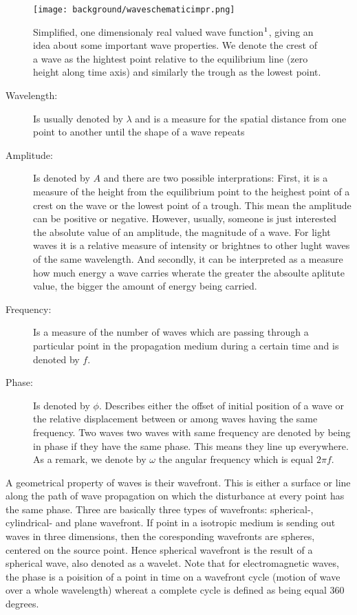 \begin{figure}[H]
  \centering
  \texttt{[image: background/waveschematicimpr.png]}
  \caption[sinewave]{Simplified, one dimensionaly real valued wave function$\footnotemark$, giving an idea about some important wave properties. We denote the crest of a wave as the hightest point relative to the equilibrium line (zero height along time axis) and similarly the trough as the lowest point.}
  \label{fig:wavebasics}
\end{figure}

\begin{description}
  \item[Wavelength:] Is usually denoted by $\lambda$ and is a measure for the spatial distance from one point to another until the shape of a wave repeats
  \item[Amplitude:] Is denoted by $A$ and there are two possible interprations: First, it is a measure of the height from the equilibrium point to the heighest point of a crest on the wave or the lowest point of a trough. This mean the amplitude can be positive or negative. However, usually, someone is  just interested the absolute value of an amplitude, the magnitude of a wave. For light waves it is a relative measure of intensity or brightnes to other lught waves of the same wavelength. And secondly, it can be interpreted as a measure how much energy a wave carries wherate the greater the absoulte aplitute value, the bigger the amount of energy being carried.
  \item[Frequency:] Is a measure of the number of waves which are passing through a particular point in the propagation medium during a certain time and is denoted by $f$.
  \item[Phase:] Is denoted by $\phi$. Describes either the offset of initial position of a wave or the relative displacement between or among waves having the same frequency. Two waves two waves with same frequency are denoted by being in phase if they have the same phase. This means they line up everywhere. As a remark, we denote by $\omega$ the angular frequency which is equal $2\pi f$. 
\end{description}

A geometrical property of waves is their wavefront. This is either a surface or line along the path of wave propagation on which the disturbance at every point has the same phase. Three are basically three types of wavefronts: spherical-, cylindrical- and plane wavefront. If point in a isotropic medium is sending out waves in three dimensions, then the coresponding wavefronts are spheres, centered on the source point. Hence spherical wavefront is the result of a spherical wave, also denoted as a wavelet. Note that for electromagnetic waves, the phase is a poisition of a point in time on a wavefront cycle (motion of wave over a whole wavelength) whereat a complete cycle is defined as being equal 360 degrees.



